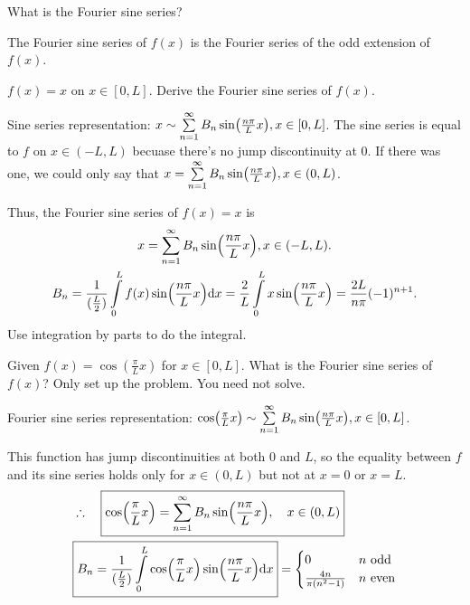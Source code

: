 \begin{quest}
\item What is the Fourier sine series?
	\begin{ans}
	The Fourier sine series of $f(x)$ is the Fourier series of the odd extension of $f(x)$. 
	\end{ans}
\item $f(x) = x$ on $x\in[0, L]$. Derive the Fourier sine series of $f(x)$. 
	\begin{ans}
		Sine series representation: $x \sim \sum\limits_{n=1}^\infty B_n \sin(\frac{n\pi}{L} x) , x\in[0, L] $. 
		The sine series is equal to $f$ on $x\in(-L, L)$ becuase there's no jump discontinuity at 0. If there was one, we could only say that $x = \sum\limits_{n=1}^\infty B_n \sin(\frac{n\pi}{L} x), x\in(0, L)$.

		Thus, the Fourier sine series of $f(x)=x$ is 
		\begin{gather*}
			x = \sum\limits_{n=1}^\infty B_n \sin(\frac{n\pi}{L} x), x\in(-L, L).  \\
			B_n = \frac{1}{(\frac{L}{2})} \int\limits_0^L 
				f(x) \sin(\frac{n\pi}{L} x) \text{d} x 
				= \frac{2}{L} \int\limits_0^L x \sin(\frac{n\pi}{L} x) = \frac{2L}{n\pi} (-1)^{n+1}.   
		\end{gather*} 
		Use integration by parts to do the integral. 
	\end{ans}
\item Given $f(x) = \cos(\frac{\pi}{L} x)$ for $x\in[0, L]$. What is the Fourier sine series of $f(x)$? Only set up the problem. You need not solve. 
\begin{ans}
Fourier sine series representation: 
$\cos(\frac{\pi}{L} x) \sim \sum\limits_{n=1}^\infty B_n \sin(\frac{n\pi}{L} x), x\in[0, L]$. 

This function has jump discontinuities at both 0 and $L$, so the equality between $f$ and its sine series holds only for $x\in(0, L)$ but not at $x=0$ or $x=L$. 
\begin{align*}
	&\therefore \quad \boxed{ \cos(\frac{\pi}{L} x) 
		= \sum\limits_{n=1}^\infty B_n \sin(\frac{n\pi}{L} x), \quad x\in(0, L) } \\
	& \boxed{ B_n = \frac{1}{(\frac{L}{2})} 
		\int\limits_0^L \cos(\frac{\pi}{L} x)
		 \sin(\frac{n\pi}{L} x) \text{d} x  } 
		= \begin{cases}
			0 &\text{$n$ odd} \\
			\frac{4n}{\pi(n^2-1)} &\text{$n$ even} 
		\end{cases}
\end{align*} 
\end{ans} 
\end{quest}

